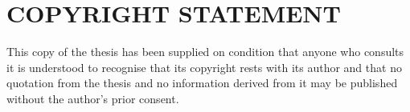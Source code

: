 %
%
%
\chapter*{COPYRIGHT STATEMENT}
\begin{SingleSpace}
This copy of the thesis has been supplied on condition that anyone who consults it is understood to recognise that its copyright rests with its author and that no quotation from the thesis and no information derived from it may be published without the author's prior consent.
\end{SingleSpace}
\clearpage


